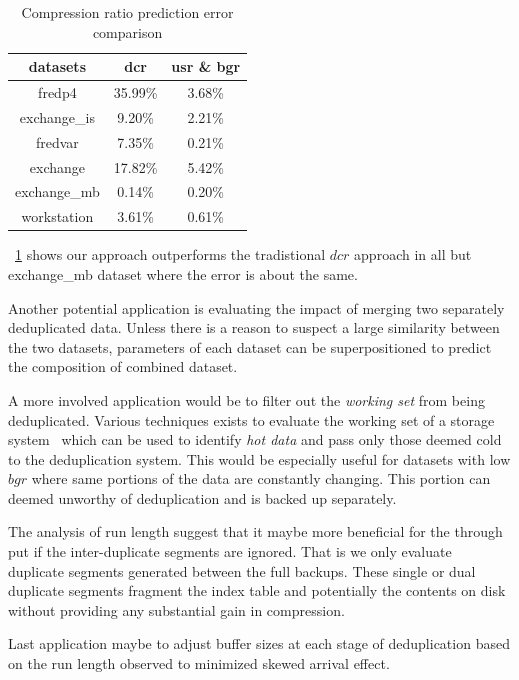 \begin{table}[!t]
\centering
\begin{tabular}{c||c c}
\hline
\bfseries datasets &\bfseries dcr	 	&\bfseries usr \& bgr	\\
\hline\hline
fredp4		&35.99\%			&3.68\%					\\
exchange\_is	&9.20\%			&2.21\%				\\
fredvar		&7.35\%			&0.21\%						\\
exchange 		&17.82\%			&5.42\%					\\
exchange\_mb 	&0.14\%			&0.20\%				\\
workstation		&3.61\%			&0.61\%				\\			
\hline
\end{tabular}
\captionsetup{format=myformat}
\caption{Compression ratio prediction error comparison}
\label{err}
\end{table}

\tablename~\ref{err} shows our approach outperforms the tradistional $dcr$ approach in all but exchange\_mb dataset where the error is about the same.

Another potential application is evaluating the impact of merging two separately deduplicated data. Unless there is a reason to suspect a large similarity between the two datasets, parameters of each dataset can be superpositioned to predict the composition of combined dataset. 

A more involved application would be to filter out the \emph{working set} from being deduplicated. Various techniques exists to evaluate the working set of a storage system~\cite{lee:2009, wang:2004} which can be used to identify \emph{hot data} and pass only those deemed cold to the deduplication system. This would be especially useful for datasets with low $bgr$ where same portions of the data are constantly changing. This portion can deemed unworthy of deduplication and is backed up separately. 

The analysis of run length suggest that it maybe more beneficial for the through put if the inter-duplicate segments are ignored. That is we only evaluate duplicate segments generated between the full backups. These single or dual duplicate segments fragment the index table and potentially the contents on disk without providing any substantial gain in compression. 

Last application maybe to adjust buffer sizes at each stage of deduplication based on the run length observed to minimized skewed arrival effect. 

